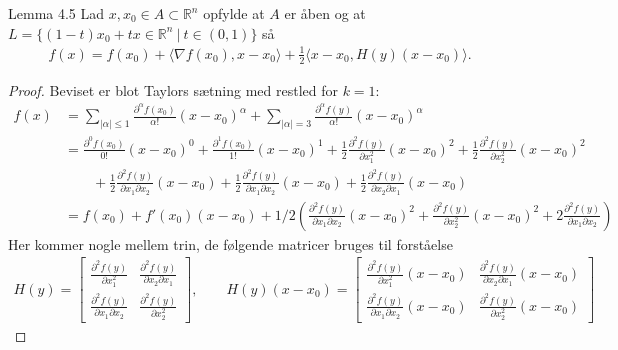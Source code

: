 \begin{boks}{Lemma 4.5}
  Lad $x,x_0 \in A \subset \mathbb{R}^n$ opfylde at $A$ er åben og at $L = \{(1-t)x_0 + tx \in \mathbb{R}^n \ | \ t \in (0,1)\}$ så
  \begin{align*}
    f(x) = f(x_0) + \langle \nabla f(x_0), x - x_0 \rangle + \frac{1}{2} \langle x - x_0, H(y)(x - x_0) \rangle.
  \end{align*}
\end{boks}
\begin{proof}
  Beviset er blot Taylors sætning med restled for $k = 1$:
  \begin{align}
    f(x) &= \sum_{| \alpha | \leq 1} \frac{\partial^\alpha f(x_0)}{\alpha!} (x - x_0)^\alpha +
    \sum_{| \alpha | = 3} \frac{\partial^\alpha f(y)}{\alpha!} (x - x_0)^\alpha \nonumber\\
    &= \frac{\partial^0 f(x_0)}{0!}(x - x_0)^0 +
    \frac{\partial^1 f(x_0)}{1!}(x - x_0)^1 +
    \frac{1}{2}\frac{\partial^2 f(y)}{\partial x_1^2}(x - x_0)^2 +
    \frac{1}{2}\frac{\partial^2 f(y)}{\partial x_2^2}(x - x_0)^2\nonumber\\
    &\qquad+
    \frac{1}{2}\frac{\partial^2f(y)}{\partial x_1 \partial x_2}(x - x_0) +
    \frac{1}{2}\frac{\partial^2 f(y)}{\partial x_1 \partial x_2}(x - x_0) +
    \frac{1}{2}\frac{\partial^2 f(y)}{\partial x_2 \partial x_1}(x - x_0)\nonumber\\
    &= f(x_0) + f'(x_0)(x - x_0) +
    1/2 \left( \frac{\partial^2f(y)}{\partial x_1 \partial x_2}(x - x_0)^2 +
    \frac{\partial^2 f(y)}{\partial x_2^2}(x - x_0)^2 + 2\frac{\partial^2 f(y)}{\partial x_1 \partial x_2} \right)\label{taylor_omskrivning}
  \end{align}
  Her kommer nogle mellem trin, de følgende matricer bruges til forståelse
  \begin{align*}
    H(y) =
    \begin{bmatrix}
      \frac{\partial^2 f(y)}{\partial x_1^2} &
      \frac{\partial^2 f(y)}{\partial x_2 \partial x_1} \\
      \frac{\partial^2 f(y)}{\partial x_1 \partial x_2} &
      \frac{\partial^2 f(y)}{\partial x_2^2}
    \end{bmatrix}, \qquad
    H(y)(x - x_0) =
    \begin{bmatrix}
      \frac{\partial^2 f(y)}{\partial x_1^2}(x - x_0) &
      \frac{\partial^2 f(y)}{\partial x_2 \partial x_1}(x - x_0) \\
      \frac{\partial^2 f(y)}{\partial x_1 \partial x_2}(x - x_0) &
      \frac{\partial^2 f(y)}{\partial x_2^2}(x - x_0)

\end{bmatrix}
\end{align*}
\end{proof}
